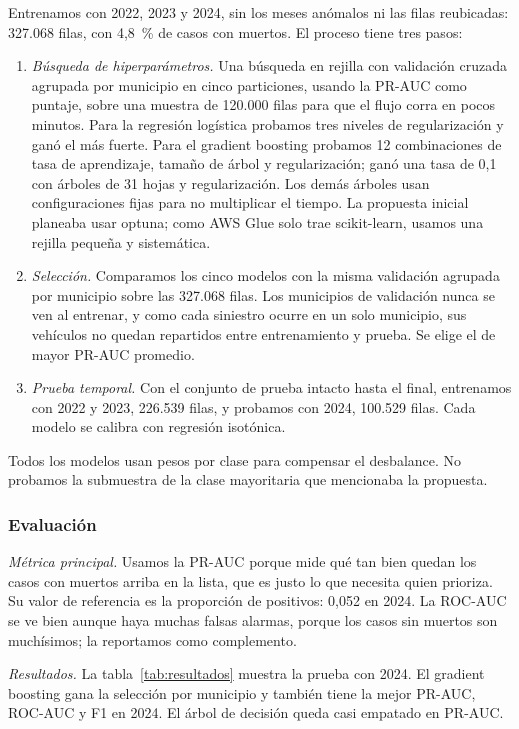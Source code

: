 \documentclass[11pt,a4paper]{article}
\begin{document}
Entrenamos con 2022, 2023 y 2024, sin los meses anómalos ni las filas reubicadas: 327.068 filas, con 4,8~\% de casos con muertos. El proceso tiene tres pasos:

\begin{enumerate}
  \item \textit{Búsqueda de hiperparámetros.} Una búsqueda en rejilla con validación cruzada agrupada por municipio en cinco particiones, usando la PR-AUC como puntaje, sobre una muestra de 120.000 filas para que el flujo corra en pocos minutos. Para la regresión logística probamos tres niveles de regularización y ganó el más fuerte. Para el gradient boosting probamos 12 combinaciones de tasa de aprendizaje, tamaño de árbol y regularización; ganó una tasa de 0,1 con árboles de 31 hojas y regularización. Los demás árboles usan configuraciones fijas para no multiplicar el tiempo. La propuesta inicial planeaba usar optuna; como AWS Glue solo trae scikit-learn, usamos una rejilla pequeña y sistemática.
  \item \textit{Selección.} Comparamos los cinco modelos con la misma validación agrupada por municipio sobre las 327.068 filas. Los municipios de validación nunca se ven al entrenar, y como cada siniestro ocurre en un solo municipio, sus vehículos no quedan repartidos entre entrenamiento y prueba. Se elige el de mayor PR-AUC promedio.
  \item \textit{Prueba temporal.} Con el conjunto de prueba intacto hasta el final, entrenamos con 2022 y 2023, 226.539 filas, y probamos con 2024, 100.529 filas. Cada modelo se calibra con regresión isotónica.
\end{enumerate}

Todos los modelos usan pesos por clase para compensar el desbalance. No probamos la submuestra de la clase mayoritaria que mencionaba la propuesta.

\subsubsection{Evaluación}

\textit{Métrica principal.} Usamos la PR-AUC porque mide qué tan bien quedan los casos con muertos arriba en la lista, que es justo lo que necesita quien prioriza. Su valor de referencia es la proporción de positivos: 0,052 en 2024. La ROC-AUC se ve bien aunque haya muchas falsas alarmas, porque los casos sin muertos son muchísimos; la reportamos como complemento.

\textit{Resultados.} La tabla~\ref{tab:resultados} muestra la prueba con 2024. El gradient boosting gana la selección por municipio y también tiene la mejor PR-AUC, ROC-AUC y F1 en 2024. El árbol de decisión queda casi empatado en PR-AUC.
\end{document}
